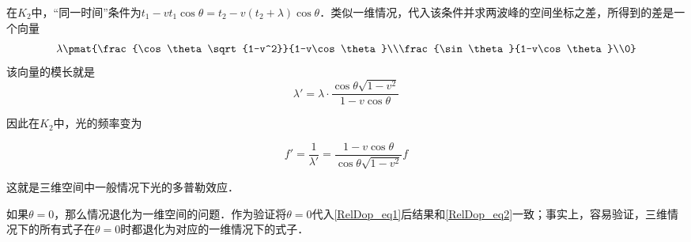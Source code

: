 在$K_2$中，“同一时间”条件为$t_1-vt_1\cos{\theta}=t_2-v(t_2+\lambda)\cos{\theta}$．类似一维情况，代入该条件并求两波峰的空间坐标之差，所得到的差是一个向量
\begin{equation}
\lambda\pmat{\frac{\cos\theta\sqrt{1-v^2}}{1-v\cos\theta}\\\frac{\sin\theta}{1-v\cos\theta}\\0}
\end{equation}
该向量的模长就是
\begin{equation}
\lambda'=\lambda\cdot\frac{\cos\theta\sqrt{1-v^2}}{1-v\cos\theta}
\end{equation}

因此在$K_2$中，光的频率变为

\begin{equation}\label{RelDop_eq1}
f'=\frac{1}{\lambda'}=\frac{1-v\cos\theta}{\cos\theta\sqrt{1-v^2}}f
\end{equation}

这就是三维空间中一般情况下光的多普勒效应．

如果$\theta=0$，那么情况退化为一维空间的问题．作为验证将$\theta=0$代入\autoref{RelDop_eq1}后结果和\autoref{RelDop_eq2}一致；事实上，容易验证，三维情况下的所有式子在$\theta=0$时都退化为对应的一维情况下的式子．
